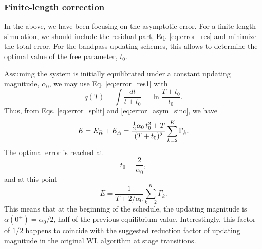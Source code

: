 \documentclass[reprint, floatfix]{revtex4-1}
\begin{document}
\subsubsection{\label{sec:finlencorr}
Finite-length correction}



In the above, we have been focusing on
the asymptotic error.
%
For a finite-length simulation,
we should include the residual part,
Eq. \eqref{eq:error_res}
and minimize the total error.
%
For the bandpass updating schemes,
this allows to determine the optimal value
of the free parameter, $t_0$.

Assuming the system is initially equilibrated
under a constant updating magnitude,
$\alpha_0$,
we may use Eq. \eqref{eq:error_res1} with
$$
q(T)
=
\int \frac{ dt } { t + t_0 }
=
\ln \frac{ T + t_0 } { t_0 }.
$$
%
Thus, from Eqs. \eqref{eq:error_split}
and \eqref{eq:error_asym_sinc}, we have
%
\begin{equation}
  E
  =
  E_R + E_A
  =
  \frac { \frac 1 2 \alpha_0 \, t_0^2 + T }
        {          ( T + t_0 )^2          }
  \sum_{ k = 2 }^K \Gamma_k
  .
\notag
\end{equation}
%
The optimal error is reached at
%
\begin{equation}
  t_0
  =
  \frac{     2    }
       { \alpha_0 }
  ,
\label{eq:t0_sinc}
\end{equation}
%
and at this point
%
\begin{equation}
  E
  =
  \frac{        1         }
       { T + 2 / \alpha_0 }
  \sum_{ k = 2 }^K
    \Gamma_k
  .
\label{eq:error_sinc}
\end{equation}
%
This means that at the beginning of the schedule,
the updating magnitude is
$\alpha(0^+) = \alpha_0 / 2$,
half of the previous equilibrium value.
%
Interestingly, this factor of $1/2$
happens to coincide with the suggested
reduction factor of updating magnitude
in the original WL algorithm\cite{wang2001, wang2001pre}
at stage transitions.




%
%
\end{document}
